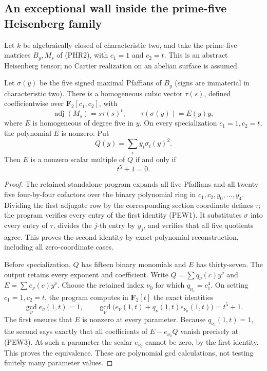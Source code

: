 \subsection{An exceptional wall inside the prime-five Heisenberg family}

Let \(k\) be algebraically closed of characteristic two, and take
the prime-five matrices \(B_y,M_s\) of (PHR2), with
\(c_1=1\) and \(c_2=t\). This is an abstract Heisenberg tensor;
no Cartier realization on an abelian surface is assumed.

\begin{lemma}
\label{lem:prime-five-exceptional-composition}
Let \(\sigma(y)\) be the five signed maximal Pfaffians of \(B_y\)
(signs are immaterial in characteristic two). There is a homogeneous
cubic vector \(\tau(s)\), defined coefficientwise over
\(\mathbf F_2[c_1,c_2]\), with
\[
       \operatorname{adj}(M_s)=s\tau(s)^t,
       \qquad \tau(\sigma(y))=E(y)y,                 \tag{PEW1}
\]
where \(E\) is homogeneous of degree five in \(y\).
On every specialization \(c_1=1,c_2=t\), the polynomial \(E\)
is nonzero. Put
\[
                         Q(y)=\sum_i y_i\sigma_i(y)^2.
                                                        \tag{PEW2}
\]
Then \(E\) is a nonzero scalar multiple of \(Q\) if and only if
\[
                              t^5+1=0.               \tag{PEW3}
\]
\end{lemma}
\begin{proof}
The retained standalone program expands all five Pfaffians and
all twenty-five four-by-four cofactors over the binary polynomial
ring in \(c_1,c_2,y_0,\ldots,y_4\). Dividing the first adjugate
row by the corresponding section coordinate defines \(\tau\);
the program verifies every entry of the first identity (PEW1).
It substitutes \(\sigma\) into every entry of \(\tau\), divides
the \(j\)-th entry by \(y_j\), and verifies that all five
quotients agree. This proves the second identity by exact
polynomial reconstruction, including all zero-coordinate cases.

Before specialization, \(Q\) has fifteen binary monomials and
\(E\) has thirty-seven. The output retains every exponent and
coefficient. Write \(Q=\sum q_\nu(c)y^\nu\) and
\(E=\sum e_\nu(c)y^\nu\). Choose the retained index \(\nu_0\)
for which \(q_{\nu_0}=c_1^4\). On setting \(c_1=1,c_2=t\),
the program computes in \(\mathbf F_2[t]\) the exact identities
\[
 \gcd_\nu e_\nu(1,t)=1,\qquad
 \gcd_\nu\bigl(e_\nu(1,t)+q_\nu(1,t)e_{\nu_0}(1,t)\bigr)
                              =t^5+1.                \tag{PEW4}
\]
The first ensures that \(E\) is nonzero at every parameter.
Because \(q_{\nu_0}(1,t)=1\), the second says exactly that
all coefficients of \(E-e_{\nu_0}Q\) vanish precisely at
(PEW3). At such a parameter the scalar \(e_{\nu_0}\) cannot
be zero, by the first identity. This proves the equivalence.
These are polynomial gcd calculations, not testing finitely many
parameter values.
\end{proof}

